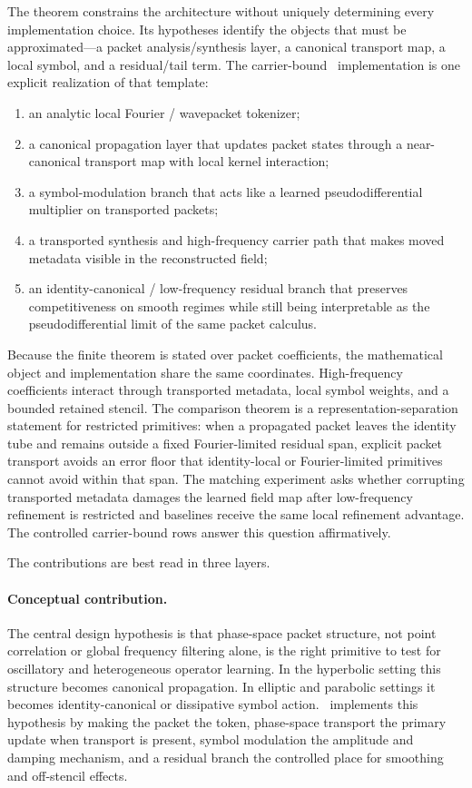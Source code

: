 The theorem constrains the architecture without uniquely determining every implementation choice.  Its hypotheses identify the objects that must be approximated---a packet analysis/synthesis layer, a canonical transport map, a local symbol, and a residual/tail term.  The carrier-bound \MiNO\ implementation is one explicit realization of that template:
\begin{enumerate}
\item an analytic local Fourier / wavepacket tokenizer;
\item a canonical propagation layer that updates packet states through a near-canonical transport map with local kernel interaction;
\item a symbol-modulation branch that acts like a learned pseudodifferential multiplier on transported packets;
\item a transported synthesis and high-frequency carrier path that makes moved metadata visible in the reconstructed field;
\item an identity-canonical / low-frequency residual branch that preserves competitiveness on smooth regimes while still being interpretable as the pseudodifferential limit of the same packet calculus.
\end{enumerate}
Because the finite theorem is stated over packet coefficients, the mathematical object and implementation share the same coordinates.  High-frequency coefficients interact through transported metadata, local symbol weights, and a bounded retained stencil.  The comparison theorem is a representation-separation statement for restricted primitives: when a propagated packet leaves the identity tube and remains outside a fixed Fourier-limited residual span, explicit packet transport avoids an error floor that identity-local or Fourier-limited primitives cannot avoid within that span.  The matching experiment asks whether corrupting transported metadata damages the learned field map after low-frequency refinement is restricted and baselines receive the same local refinement advantage.  The controlled carrier-bound rows answer this question affirmatively.

The contributions are best read in three layers.

\paragraph{Conceptual contribution.}
The central design hypothesis is that phase-space packet structure, not point correlation or global frequency filtering alone, is the right primitive to test for oscillatory and heterogeneous operator learning.  In the hyperbolic setting this structure becomes canonical propagation.  In elliptic and parabolic settings it becomes identity-canonical or dissipative symbol action.  \MiNO\ implements this hypothesis by making the packet the token, phase-space transport the primary update when transport is present, symbol modulation the amplitude and damping mechanism, and a residual branch the controlled place for smoothing and off-stencil effects.


